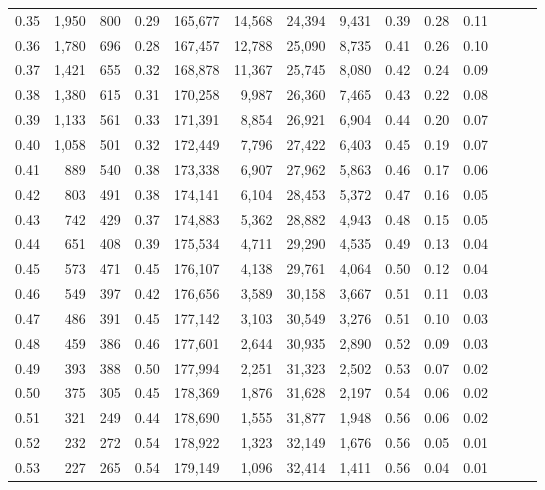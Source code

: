 \begin{tabular}{rrrrrrrrrrrrrr}
0.35 &  1,950 &    800 &  0.29 &  165,677 &   14,568 &  24,394 &   9,431 &  0.39 &  0.28 &      0.11 \\
0.36 &  1,780 &    696 &  0.28 &  167,457 &   12,788 &  25,090 &   8,735 &  0.41 &  0.26 &      0.10 \\
0.37 &  1,421 &    655 &  0.32 &  168,878 &   11,367 &  25,745 &   8,080 &  0.42 &  0.24 &      0.09 \\
0.38 &  1,380 &    615 &  0.31 &  170,258 &    9,987 &  26,360 &   7,465 &  0.43 &  0.22 &      0.08 \\
0.39 &  1,133 &    561 &  0.33 &  171,391 &    8,854 &  26,921 &   6,904 &  0.44 &  0.20 &      0.07 \\
0.40 &  1,058 &    501 &  0.32 &  172,449 &    7,796 &  27,422 &   6,403 &  0.45 &  0.19 &      0.07 \\
0.41 &    889 &    540 &  0.38 &  173,338 &    6,907 &  27,962 &   5,863 &  0.46 &  0.17 &      0.06 \\
0.42 &    803 &    491 &  0.38 &  174,141 &    6,104 &  28,453 &   5,372 &  0.47 &  0.16 &      0.05 \\
0.43 &    742 &    429 &  0.37 &  174,883 &    5,362 &  28,882 &   4,943 &  0.48 &  0.15 &      0.05 \\
0.44 &    651 &    408 &  0.39 &  175,534 &    4,711 &  29,290 &   4,535 &  0.49 &  0.13 &      0.04 \\
0.45 &    573 &    471 &  0.45 &  176,107 &    4,138 &  29,761 &   4,064 &  0.50 &  0.12 &      0.04 \\
0.46 &    549 &    397 &  0.42 &  176,656 &    3,589 &  30,158 &   3,667 &  0.51 &  0.11 &      0.03 \\
0.47 &    486 &    391 &  0.45 &  177,142 &    3,103 &  30,549 &   3,276 &  0.51 &  0.10 &      0.03 \\
0.48 &    459 &    386 &  0.46 &  177,601 &    2,644 &  30,935 &   2,890 &  0.52 &  0.09 &      0.03 \\
0.49 &    393 &    388 &  0.50 &  177,994 &    2,251 &  31,323 &   2,502 &  0.53 &  0.07 &      0.02 \\
0.50 &    375 &    305 &  0.45 &  178,369 &    1,876 &  31,628 &   2,197 &  0.54 &  0.06 &      0.02 \\
0.51 &    321 &    249 &  0.44 &  178,690 &    1,555 &  31,877 &   1,948 &  0.56 &  0.06 &      0.02 \\
0.52 &    232 &    272 &  0.54 &  178,922 &    1,323 &  32,149 &   1,676 &  0.56 &  0.05 &      0.01 \\
0.53 &    227 &    265 &  0.54 &  179,149 &    1,096 &  32,414 &   1,411 &  0.56 &  0.04 &      0.01 \\

\end{tabular}

